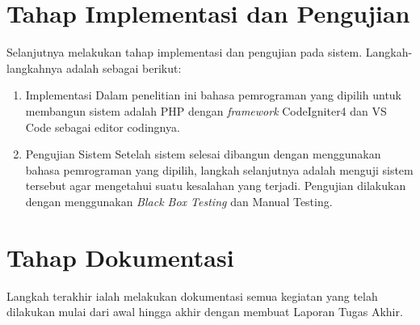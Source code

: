 \section{Tahap Implementasi dan Pengujian}
Selanjutnya melakukan tahap implementasi dan pengujian pada sistem. Langkah-langkahnya adalah sebagai berikut:
\begin{enumerate}
	\item Implementasi Dalam penelitian ini bahasa pemrograman yang dipilih untuk membangun sistem adalah PHP dengan \textit{framework} CodeIgniter4 dan VS Code sebagai editor codingnya.
	\item Pengujian Sistem Setelah sistem selesai dibangun dengan menggunakan bahasa pemrograman yang dipilih, langkah selanjutnya adalah menguji sistem tersebut agar mengetahui suatu kesalahan yang terjadi. Pengujian dilakukan dengan menggunakan \textit{Black Box Testing} dan Manual Testing.
\end{enumerate}

\section{Tahap Dokumentasi}
Langkah terakhir ialah melakukan dokumentasi semua kegiatan yang telah dilakukan mulai dari awal hingga akhir dengan membuat Laporan Tugas Akhir.
